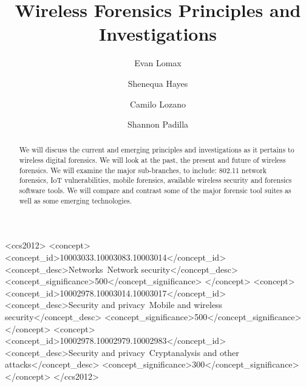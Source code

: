 \documentclass[acmlarge]{acmart}
\begin{document}
\title{Wireless Forensics Principles and Investigations}



\author{Evan Lomax}

\author{Shenequa Hayes}
\author{Camilo Lozano}
\author{Shannon Padilla}

\renewcommand{\shortauthors}{Lomax, et al.}

\begin{abstract}
We will discuss the current and emerging principles and investigations as it pertains to wireless digital forensics. We will look at the past, the present and future of wireless forensics. We will examine the major sub-branches, to include: 802.11 network forensics, IoT vulnerabilities, mobile forensics, available wireless security and forensics software tools. We will compare and contrast some of the major forensic tool suites as well as some emerging technologies.
\end{abstract}

\begin{CCSXML}
<ccs2012>
   <concept>
       <concept_id>10003033.10003083.10003014</concept_id>
       <concept_desc>Networks~Network security</concept_desc>
       <concept_significance>500</concept_significance>
       </concept>
   <concept>
       <concept_id>10002978.10003014.10003017</concept_id>
       <concept_desc>Security and privacy~Mobile and wireless security</concept_desc>
       <concept_significance>500</concept_significance>
       </concept>
   <concept>
       <concept_id>10002978.10002979.10002983</concept_id>
       <concept_desc>Security and privacy~Cryptanalysis and other attacks</concept_desc>
       <concept_significance>300</concept_significance>
       </concept>
 </ccs2012>
\end{CCSXML}

\end{document}
